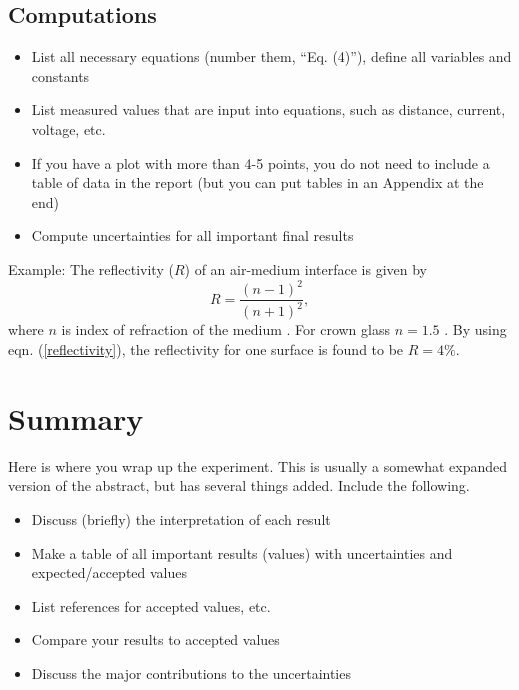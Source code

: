 \documentclass[aps,prl,reprint]{revtex4-2}
\begin{document}
\subsection{Computations}

\begin{itemize}
\item List all necessary equations (number them, “Eq. (4)”), define all variables and constants 
\item List measured values that are input into equations, such as distance, current, voltage, etc.
\item If you have a plot with more than 4-5 points, you do not need to include a table of data in the report (but you can put tables in an Appendix at the end)
\item Compute uncertainties for all important final results
\end{itemize}

Example: The reflectivity ($R$) of an air-medium interface is given by
\begin{equation} 
R = \frac{ (n-1)^2 } { (n+1)^2 },
\label{reflectivity}
\end{equation}
%
where $n$ is index of refraction of the medium \cite{wiki-spectroscopy}. For crown glass $n = 1.5$ . By using eqn. (\ref{reflectivity}),  the reflectivity for one surface is found to be $R = 4\%$.

\section{Summary}

Here is where you wrap up the experiment. This is usually a somewhat expanded version of the abstract, but has several things added. Include the following. 

\begin{itemize}
\item Discuss (briefly) the interpretation of each result
\item Make a table of all important results (values) with uncertainties and expected/accepted values
\item List references for accepted values, etc.
\item Compare your results to accepted values
\item Discuss the major contributions to the uncertainties
\end{itemize}
\end{document}
